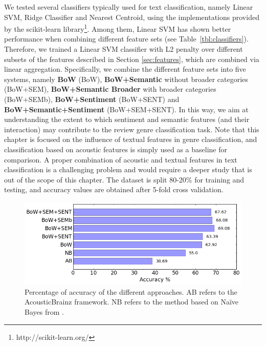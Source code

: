 We tested several classifiers typically used for text classification, namely Linear SVM, Ridge Classifier and Nearest Centroid, using the implementations provided by the scikit-learn library\footnote{http://scikit-learn.org/}. Among them, Linear SVM has shown better performance when combining different feature sets (see Table~\ref{tbl:classifiers}). Therefore, we trained a Linear SVM classifier with L2 penalty over different subsets of the features described in Section \ref{sec:features}, which are combined via linear aggregation. Specifically, we combine the different feature sets into five systems, namely \textbf{BoW} (BoW), \textbf{BoW+Semantic} without broader categories (BoW+SEM), \textbf{BoW+Semantic Broader} with broader categories (BoW+SEMb), \textbf{BoW+Sentiment} (BoW+SENT) and \textbf{BoW+Semantic+Sentiment} (BoW+SEM+SENT). In this way, we aim at understanding the extent to which sentiment and semantic features (and their interaction) may contribute to the review genre classification task. Note that this chapter is focused on the influence of textual features in genre classification, and classification based on acoustic features is simply used as a baseline for comparison. A proper combination of acoustic and textual features in text classification is a challenging problem and would require a deeper study that is out of the scope of this chapter.
The dataset is split 80-20\% for training and testing, and accuracy values are obtained after 5-fold cross validation. 

\begin{figure}
    \centering
    \includegraphics[width=\columnwidth]{ch07_text-class/pics/results2.png}
    \caption{Percentage of accuracy of the different approaches. AB refers to the AcousticBrainz framework. NB refers to the method based on Na\"{i}ve Bayes from \cite{Hu2005}.}
    \label{fig:results}
\end{figure}

